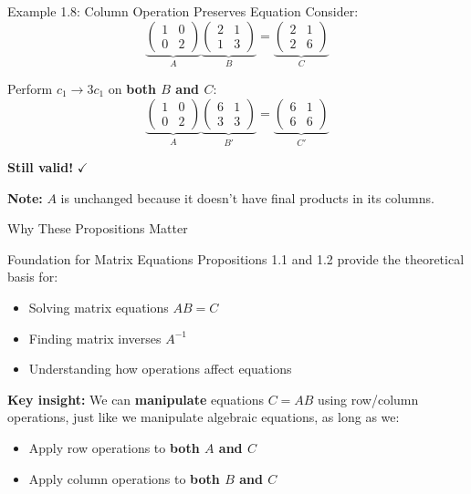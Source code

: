 \documentclass[10pt]{beamer}
\theoremstyle{definition}
\newcommand{\x}[1]{\alert{\textbf{#1}}}
\begin{document}
\begin{frame}{Example 1.8: Column Operation Preserves Equation}
Consider:
$$\underbrace{\begin{pmatrix} 1 & 0 \\ 0 & 2 \end{pmatrix}}_{A} \underbrace{\begin{pmatrix} 2 & 1 \\ 1 & 3 \end{pmatrix}}_{B} = \underbrace{\begin{pmatrix} 2 & 1 \\ 2 & 6 \end{pmatrix}}_{C}$$

Perform $c_1 \to 3c_1$ on \x{both $B$ and $C$}:
$$\underbrace{\begin{pmatrix} 1 & 0 \\ 0 & 2 \end{pmatrix}}_{A} \underbrace{\begin{pmatrix} 6 & 1 \\ 3 & 3 \end{pmatrix}}_{B'} = \underbrace{\begin{pmatrix} 6 & 1 \\ 6 & 6 \end{pmatrix}}_{C'}$$

\begin{center}
\Large \textbf{Still valid!} $\checkmark$
\end{center}

\vspace{0.3cm}
\textbf{Note:} $A$ is unchanged because it doesn't have final products in its columns.
\end{frame}

\begin{frame}{Why These Propositions Matter}
\begin{block}{Foundation for Matrix Equations}
Propositions 1.1 and 1.2 provide the theoretical basis for:
\begin{itemize}
\item Solving matrix equations $AB = C$
\item Finding matrix inverses $A^{-1}$
\item Understanding how operations affect equations
\end{itemize}
\end{block}

\vspace{0.5cm}
\textbf{Key insight:} We can \x{manipulate} equations $C = AB$ using row/column operations, just like we manipulate algebraic equations, as long as we:
\begin{itemize}
\item Apply row operations to \x{both $A$ and $C$}
\item Apply column operations to \x{both $B$ and $C$}
\end{itemize}
\end{frame}
\end{document}
